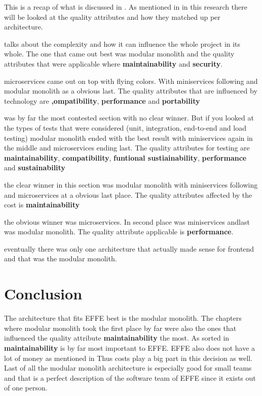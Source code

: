 This is a recap of what is discussed in . As mentioned in  in this research there will be looked at the quality attributes and how they matched up per architecture.

 talks about the complexity and how it can influence the whole project in its whole. The one that came out best was modular monolith and the quality attributes that were applicable where \textbf{maintainability} and \textbf{security}.

 microservices came out on top with flying colors. With miniservices following and modular monolith as a obvious last. The quality attributes that are influenced by technology are \textbf{,ompatibility}, \textbf{performance} and \textbf{portability}

 was by far the most contested section with no clear winner. But if you looked at the types of tests that were considered (unit, integration, end-to-end and load testing) modular monolith ended with the best result with miniservices again in the middle and microservices ending last. The quality attributes for testing are \textbf{maintainability}, \textbf{compatibility}, \textbf{funtional sustiainability}, \textbf{performance} and \textbf{sustainability}

 the clear winner in this section was modular monolith with miniservices following and microservices at a obvious last place. The quality attributes affected by the cost is \textbf{maintainability}

 the obvious winner was microservices. In second place was miniservices andlast was modular monolith. The quality attribute applicable is \textbf{performance}.

 eventually there was only one architecture that actually made sense for frontend and that was the modular monolith.

\section{Conclusion}

The architecture that fits EFFE best is the modular monolith. The chapters where modular monolith took the first place by far were also the ones that influenced the quality attribute \textbf{maintainability} the most. As sorted in  \textbf{maintainability} is by far most important to EFFE. EFFE also does not have a lot of money as mentioned in  Thus costs play a big part in this decision as well. Last of all the modular monolith architecture is especially good for small teams and that is a perfect description of the software team of EFFE since it exists out of one person.

